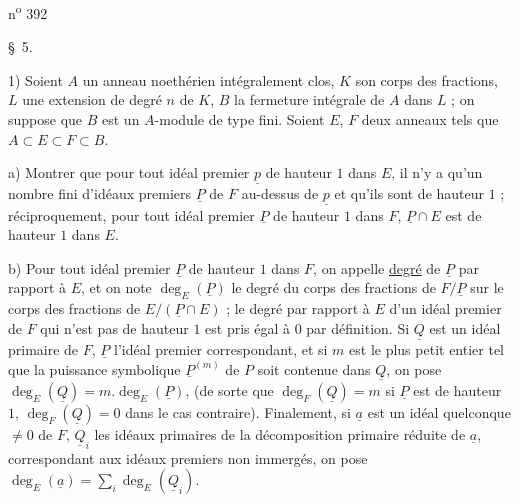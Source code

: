 n\textsuperscript{o} 392

\S~5.

1) Soient $A$ un anneau noethérien intégralement clos, $K$ son corps des fractions, $L$ une extension de degré $n$ de $K$, $B$ la fermeture intégrale de $A$ dans $L$ ; on suppose que $B$ est un $A$-module de type fini. Soient $E$, $F$ deux anneaux tels que $A\subset E\subset F\subset B$.

a) Montrer que pour tout idéal premier $\underline p$ de hauteur $1$ dans $E$, il n'y a qu'un nombre fini d'idéaux premiers $\underline P$ de $F$ au-dessus de $\underline p$ et qu'ils sont de hauteur $1$ ; réciproquement, pour tout idéal premier $\underline P$ de hauteur $1$ dans $F$, $\underline P\cap E$ est de hauteur $1$ dans $E$.

b) Pour tout idéal premier $\underline P$ de hauteur $1$ dans $F$, on appelle \uline{degré} de $\underline P$ par rapport à $E$, et on note $\deg_E(\underline P)$ le degré du corps des fractions de $F/\underline P$ sur le corps des fractions de $E/(\underline P\cap E)$ ; le degré par rapport à $E$ d'un idéal premier de $F$ qui n'est pas de hauteur $1$ est pris égal à $0$ par définition. Si $\underline Q$ est un idéal primaire de $F$, $\underline P$ l'idéal premier correspondant, et si $m$ est le plus petit entier tel que la puissance symbolique $\underline P^{(m)}$ de $P$ soit contenue dans $\underline Q$, on pose $\deg_E(\underline Q)=m.\deg_E(\underline P)$, (de sorte que $\deg_F(\underline Q)=m$ si $\underline P$ est de hauteur $1$, $\deg_F(\underline Q)=0$ dans le cas contraire). Finalement, si $\underline a$ est un idéal quelconque $\ne 0$ de $F$, $\underline Q_i$ les idéaux primaires de la décomposition primaire réduite de $\underline a$, correspondant aux idéaux premiers non immergés, on pose $\deg_E(\underline a)=\sum_i\deg_E(\underline Q_i)$.

